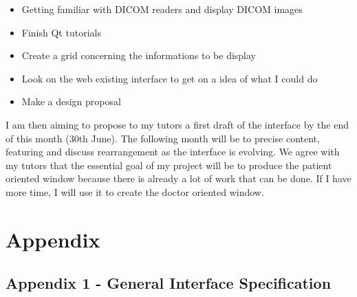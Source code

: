 \documentclass[12pt,twoside]{article}
\begin{document}
\begin{itemize} 
\item Getting familiar with DICOM readers and display DICOM images
\item Finish Qt tutorials
\item Create a grid concerning the informations to be display
\item Look on the web existing interface to get on a idea of what I could do
\item Make a design proposal
\end{itemize}	


I am then aiming to propose to my tutors a first draft of the interface by the end of this month (30th June). The following month will be to precise content, featuring and discuss rearrangement as the interface is evolving.
We agree with my tutors that the essential goal of my project will be to produce the patient oriented window because there is already a lot of work that can be done. If I have more time, I will use it to create the doctor oriented window.









\clearpage
\section{Appendix}
\subsection {Appendix 1 - General Interface Specification}
\end{document}
